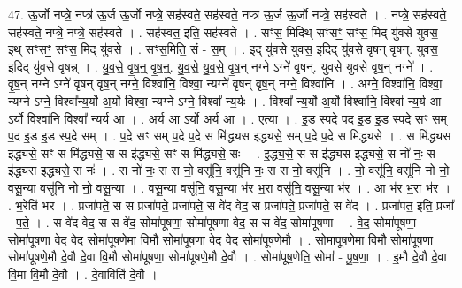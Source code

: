 \documentclass[17pt]{extarticle}
\begin{document}
47. ऊ॒र्जो नप्त्रे॒ नप्त्र॑ ऊ॒र्ज ऊ॒र्जो नप्त्रे॒ सह॑स्वते॒ सह॑स्वते॒ नप्त्र॑ ऊ॒र्ज ऊ॒र्जो नप्त्रे॒ सह॑स्वते । . नप्त्रे॒ सह॑स्वते॒ सह॑स्वते॒ नप्त्रे॒ नप्त्रे॒ सह॑स्वते । . सह॑स्वत॒ इति॒ सह॑स्वते । . सꣳस॒ मिदिथ् सꣳसꣳ॒॒ सꣳस॒ मिद् यु॑वसे युवस॒ इथ् सꣳसꣳ॒॒ सꣳस॒ मिद् यु॑वसे । . सꣳस॒मिति॒ सं - स॒म् । . इद् यु॑वसे युवस॒ इदिद् यु॑वसे वृषन् वृषन्. युवस॒ इदिद् यु॑वसे वृषन्न् । . यु॒व॒से॒ वृ॒ष॒न्॒ वृ॒ष॒न्॒. यु॒व॒से॒ यु॒व॒से॒ वृ॒ष॒न् नग्ने ऽग्ने॑ वृषन्. युवसे युवसे वृष॒न् नग्ने᳚ । . वृ॒ष॒न् नग्ने ऽग्ने॑ वृषन् वृष॒न् नग्ने॒ विश्वा॑नि॒ विश्वा॒ न्यग्ने॑ वृषन् वृष॒न् नग्ने॒ विश्वा॑नि । . अग्ने॒ विश्वा॑नि॒ विश्वा॒ न्यग्ने ऽग्ने॒ विश्वा᳚न्य॒र्यो अ॒र्यो विश्वा॒ न्यग्ने ऽग्ने॒ विश्वा᳚ न्य॒र्यः । . विश्वा᳚ न्य॒र्यो अ॒र्यो विश्वा॑नि॒ विश्वा᳚ न्य॒र्य आ ऽर्यो विश्वा॑नि॒ विश्वा᳚ न्य॒र्य आ । . अ॒र्य आ ऽर्यो अ॒र्य आ । . एत्या । . इ॒ड स्प॒दे प॒द इ॒ड इ॒ड स्प॒दे सꣳ सम् प॒द इ॒ड इ॒ड स्प॒दे सम् । . प॒दे सꣳ सम् प॒दे प॒दे स मि॑द्ध्यस इद्ध्यसे॒ सम् प॒दे प॒दे स मि॑द्ध्यसे । . स मि॑द्ध्यस इद्ध्यसे॒ सꣳ स मि॑द्ध्यसे॒ स स इ॑द्ध्यसे॒ सꣳ स मि॑द्ध्यसे॒ सः । . इ॒द्ध्य॒से॒ स स इ॑द्ध्यस इद्ध्यसे॒ स नो॑ नः॒ स इ॑द्ध्यस इद्ध्यसे॒ स नः॑ । . स नो॑ नः॒ स स नो॒ वसू॑नि॒ वसू॑नि नः॒ स स नो॒ वसू॑नि । . नो॒ वसू॑नि॒ वसू॑नि नो नो॒ वसू॒न्या वसू॑नि नो नो॒ वसू॒न्या । . वसू॒न्या वसू॑नि॒ वसू॒न्या भ॑र भ॒रा वसू॑नि॒ वसू॒न्या भ॑र । . आ भ॑र भ॒रा भ॑र । . भ॒रेति॑ भर । . प्रजा॑पते॒ स स प्रजा॑पते॒ प्रजा॑पते॒ स वे॑द वेद॒ स प्रजा॑पते॒ प्रजा॑पते॒ स वे॑द । . प्रजा॑पत॒ इति॒ प्रजा᳚ - प॒ते॒ । . स वे॑द वेद॒ स स वे॑द॒ सोमा॑पूषणा॒ सोमा॑पूषणा वेद॒ स स वे॑द॒ सोमा॑पूषणा । . वे॒द॒ सोमा॑पूषणा॒ सोमा॑पूषणा वेद वेद॒ सोमा॑पूषणे॒मा वि॒मौ सोमा॑पूषणा वेद वेद॒ सोमा॑पूषणे॒मौ । . सोमा॑पूषणे॒मा वि॒मौ सोमा॑पूषणा॒ सोमा॑पूषणे॒मौ दे॒वौ दे॒वा वि॒मौ सोमा॑पूषणा॒ सोमा॑पूषणे॒मौ दे॒वौ । . सोमा॑पूष॒णेति॒ सोमा᳚ - पू॒ष॒णा॒ । . इ॒मौ दे॒वौ दे॒वा वि॒मा वि॒मौ दे॒वौ । . दे॒वाविति॑ दे॒वौ । \newline
\pagebreak
{}
\end{document}
